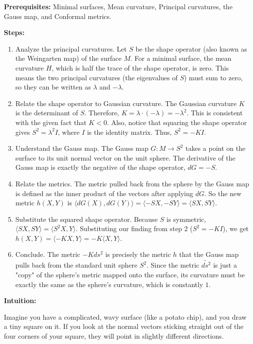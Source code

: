 \begin{solution}
\textbf{Prerequisites:} Minimal surfaces, Mean curvature, Principal curvatures, the Gauss map, and Conformal metrics.

\textbf{Steps:}
\begin{enumerate}
    \item Analyze the principal curvatures. Let $S$ be the shape operator (also known as the Weingarten map) of the surface $M$. For a minimal surface, the mean curvature $H$, which is half the trace of the shape operator, is zero. This means the two principal curvatures (the eigenvalues of $S$) must sum to zero, so they can be written as $\lambda$ and $-\lambda$.
    \item Relate the shape operator to Gaussian curvature. The Gaussian curvature $K$ is the determinant of $S$. Therefore, $K = \lambda \cdot (-\lambda) = -\lambda^2$. This is consistent with the given fact that $K < 0$. Also, notice that squaring the shape operator gives $S^2 = \lambda^2 I$, where $I$ is the identity matrix. Thus, $S^2 = -K I$.
    \item Understand the Gauss map. The Gauss map $G : M \to S^2$ takes a point on the surface to its unit normal vector on the unit sphere. The derivative of the Gauss map is exactly the negative of the shape operator, $dG = -S$.
    \item Relate the metrics. The metric pulled back from the sphere by the Gauss map is defined as the inner product of the vectors after applying $dG$. So the new metric $h(X, Y)$ is $\langle dG(X), dG(Y) \rangle = \langle -SX, -SY \rangle = \langle SX, SY \rangle$.
    \item Substitute the squared shape operator. Because $S$ is symmetric, $\langle SX, SY \rangle = \langle S^2X, Y \rangle$. Substituting our finding from step 2 ($S^2 = -K I$), we get $h(X, Y) = \langle -K X, Y \rangle = -K \langle X, Y \rangle$.
    \item Conclude. The metric $-K ds^2$ is precisely the metric $h$ that the Gauss map pulls back from the standard unit sphere $S^2$. Since the metric $\widetilde{ds^2}$ is just a "copy" of the sphere's metric mapped onto the surface, its curvature must be exactly the same as the sphere's curvature, which is constantly $1$.
\end{enumerate}
\textbf{Intuition:}

Imagine you have a complicated, wavy surface (like a potato chip), and you draw a tiny square on it. If you look at the normal vectors sticking straight out of the four corners of your square, they will point in slightly different directions. 


\end{solution}

